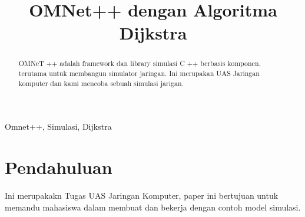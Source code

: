 \documentclass[conference]{IEEEtran}
\begin{document}
\title{OMNet++ dengan Algoritma Dijkstra}

\author{
	\and
}
\maketitle

\begin{abstract}
	OMNeT ++ adalah framework dan library simulasi C ++ berbasis komponen, terutama untuk membangun simulator jaringan. Ini merupakan UAS Jaringan komputer dan kami mencoba sebuah simulasi jarigan.

\end{abstract}

\begin{IEEEkeywords}
	Omnet++, Simulasi, Dijkstra
\end{IEEEkeywords}

\section{Pendahuluan}
Ini merupakakn Tugas UAS Jaringan Komputer, paper ini bertujuan untuk memandu mahasiswa dalam membuat dan bekerja dengan contoh model simulasi.
\end{document}
